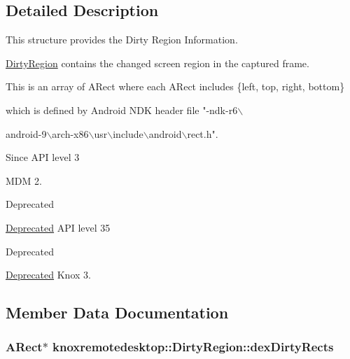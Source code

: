 \subsection{\-Detailed \-Description}
\-This structure provides the \-Dirty \-Region \-Information. 

\hyperlink{classknoxremotedesktop_1_1DirtyRegion}{\-Dirty\-Region} contains the changed screen region in the captured frame.

\-This is an array of \-A\-Rect where each \-A\-Rect includes \{left, top, right, bottom\}

which is defined by \-Android \-N\-D\-K header file "-\/ndk-\/r6$\backslash$

android-\/9$\backslash$arch-\/x86$\backslash$usr$\backslash$include$\backslash$android$\backslash$rect.\-h".

\begin{DoxySince}{\-Since}
\-A\-P\-I level 3

\-M\-D\-M 2.
\end{DoxySince}
\begin{DoxyRefDesc}{\-Deprecated}
\item[\hyperlink{deprecated__deprecated000009}{\-Deprecated}]\-A\-P\-I level 35\end{DoxyRefDesc}


\begin{DoxyRefDesc}{\-Deprecated}
\item[\hyperlink{deprecated__deprecated000010}{\-Deprecated}]\-Knox 3.\end{DoxyRefDesc}


\subsection{\-Member \-Data \-Documentation}
\hypertarget{classknoxremotedesktop_1_1DirtyRegion_a457e725e722f93c7312fa85b2f43eb77}{
\subsubsection[{dex\-Dirty\-Rects}]{\setlength{\rightskip}{0pt plus 5cm}\-A\-Rect$\ast$ {\bf knoxremotedesktop\-::\-Dirty\-Region\-::dex\-Dirty\-Rects}}}\label{classknoxremotedesktop_1_1DirtyRegion_a457e725e722f93c7312fa85b2f43eb77}


